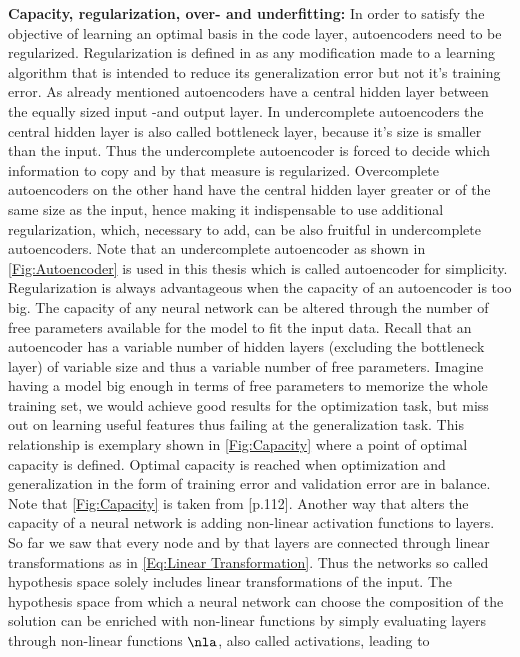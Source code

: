 \textbf{Capacity, regularization, over- and underfitting:} In order to satisfy the objective of learning an optimal basis in the code layer, autoencoders need to be regularized. Regularization is defined in \cite{Goodfellow} as any modification made to a learning algorithm that is intended to reduce its generalization error but not it's training error. As already mentioned autoencoders have a central hidden layer between the equally sized input -and output layer. In undercomplete autoencoders the central hidden layer is also called bottleneck layer, because it's size is smaller than the input. Thus the undercomplete autoencoder is forced to decide which information to copy and by that measure is regularized. Overcomplete autoencoders on the other hand have the central hidden layer greater or of the same size as the input, hence making it indispensable to use additional regularization, which, necessary to add, can be also fruitful in undercomplete autoencoders. Note that an undercomplete autoencoder as shown in \cref{Fig:Autoencoder} is used in this thesis which is called autoencoder for simplicity. Regularization is always advantageous when the capacity of an autoencoder is too big. The capacity of any neural network can be altered through the number of free parameters available for the model to fit the input data. Recall that an autoencoder has a variable number of hidden layers (excluding the bottleneck layer) of variable size and thus a variable number of free parameters. Imagine having a model big enough in terms of free parameters to memorize the whole training set, we would achieve good results for the optimization task, but miss out on learning useful features thus failing at the generalization task. This relationship is exemplary shown in \cref{Fig:Capacity} where a point of optimal capacity is defined. Optimal capacity is reached when optimization and generalization in the form of training error and validation error are in balance. Note that \cref{Fig:Capacity} is taken from \cite{Goodfellow}[p.112]. Another way that alters the capacity of a neural network is adding non-linear activation functions to layers. So far we saw that every node and by that layers are connected through linear transformations as in \cref{Eq:Linear Transformation}. Thus the networks so called hypothesis space solely includes linear transformations of the input. The hypothesis space from which a neural network can choose the composition of the solution can be enriched with non-linear functions by simply evaluating layers through non-linear functions \(\nla\), also called activations, leading to
